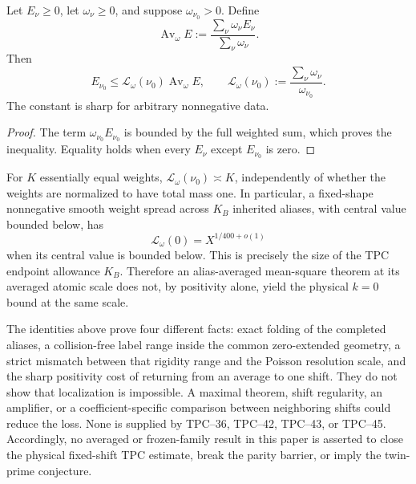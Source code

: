 \begin{lemma}
\label{lem:tpc46-weighted-localization}
Let \(E_\nu\ge0\), let \(\omega_\nu\ge0\), and suppose
\(\omega_{\nu_0}>0\).  Define
\begin{equation}
 \operatorname{Av}_\omega E
 :=\frac{\sum_\nu\omega_\nu E_\nu}
         {\sum_\nu\omega_\nu}.
 \label{eq:tpc46-weighted-average}
\end{equation}
Then
\begin{equation}
 \boxed{
 E_{\nu_0}
 \le
 \mathcal L_\omega(\nu_0)\operatorname{Av}_\omega E,
 \qquad
 \mathcal L_\omega(\nu_0)
 :=\frac{\sum_\nu\omega_\nu}{\omega_{\nu_0}}.}
 \label{eq:tpc46-localization-cost}
\end{equation}
The constant is sharp for arbitrary nonnegative data.
\end{lemma}

\begin{proof}
The term \(\omega_{\nu_0}E_{\nu_0}\) is bounded by the full weighted
sum, which proves the inequality.  Equality holds when every
\(E_\nu\) except \(E_{\nu_0}\) is zero.
\end{proof}

For \(K\) essentially equal weights,
\(\mathcal L_\omega(\nu_0)\asymp K\), independently of whether the
weights are normalized to have total mass one.  In particular, a
fixed-shape nonnegative smooth weight spread across \(K_B\) inherited
aliases, with central value bounded below, has
\begin{equation}
 \mathcal L_\omega(0)=X^{1/400+o(1)}
 \label{eq:tpc46-alias-localization-loss}
\end{equation}
when its central value is bounded below.  This is precisely the size of
the TPC endpoint allowance \(K_B\).  Therefore an alias-averaged
mean-square theorem at its averaged atomic scale does not, by positivity
alone, yield the physical \(k=0\) bound at the same scale.

\begin{remark}
\label{rem:tpc46-alias-localization-boundary}
The identities above prove four different facts: exact folding of the
completed aliases, a collision-free label range inside the common
zero-extended geometry, a strict mismatch between that rigidity range
and the Poisson resolution scale, and the sharp positivity cost of returning
from an average to one shift.  They do not show that localization is
impossible.  A maximal theorem, shift regularity, an amplifier, or a
coefficient-specific comparison between neighboring shifts could
reduce the loss.  None is supplied by TPC--36, TPC--42, TPC--43, or
TPC--45.  Accordingly, no averaged or frozen-family result in this
paper is asserted to close the physical fixed-shift TPC estimate, break
the parity barrier, or imply the twin-prime conjecture.
\end{remark}
